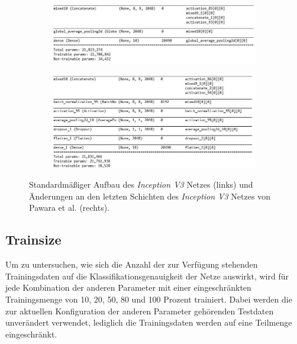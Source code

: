 \begin{figure}[H]

\begin{minipage}{.5\textwidth}
\begin{figure}[H]
\begin{adjustbox}{width=\textwidth, center}
\includegraphics[scale=1]{img/3_inception-standard.jpg}
\end{adjustbox}
\end{figure}
\end{minipage}%
\begin{minipage}{.5\textwidth}
\begin{figure}[H]
\begin{adjustbox}{width=\textwidth, center}
\includegraphics[scale=1]{img/3_inception-pawara.jpg}
\end{adjustbox}

\end{figure}
\end{minipage}
\caption{Standardmäßiger Aufbau des \textit{Inception V3} Netzes (links) und Änderungen an den letzten Schichten des \textit{Inception V3} Netzes von Pawara et al. \cite{pawaraWebsiteCode, pawaraPaper} (rechts).}
\label{fig:inceptionAenderungen}
\end{figure}


\subsection{Trainsize}
\label{ch:methodik_trainsize}
Um zu untersuchen, wie sich die Anzahl der zur Verfügung stehenden Trainingsdaten auf die Klassifikationsgenauigkeit der Netze auswirkt, wird für jede Kombination der anderen Parameter mit einer eingeschränkten Trainingsmenge von 10, 20, 50, 80 und 100 Prozent trainiert. Dabei werden die zur aktuellen Konfiguration der anderen Parameter gehörenden Testdaten unverändert verwendet, lediglich die Trainingsdaten werden auf eine Teilmenge eingeschränkt.\\


